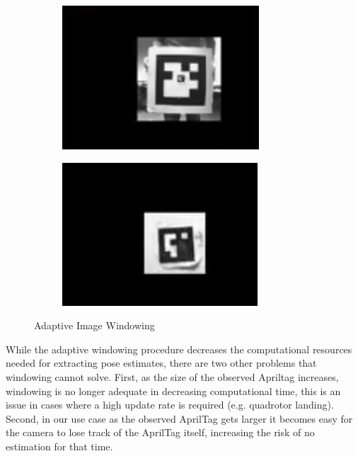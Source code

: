 \documentclass[11pt, twocolumn]{article}
\begin{document}
\begin{figure}[H]
	\centering
	\begin{subfigure}[b]{0.45\linewidth}
		\includegraphics[width=\textwidth]{images/apriltags_roi_1.png}
	\end{subfigure}
	\begin{subfigure}[b]{0.45\linewidth}
		\includegraphics[width=\textwidth]{images/apriltags_roi_2.png}
	\end{subfigure}
	\caption{Adaptive Image Windowing}
	\label{fig:apriltags_windowing}
\end{figure}

While the adaptive windowing procedure decreases the computational resources needed for extracting pose estimates, there are two other problems that windowing cannot solve. First, as the size of the observed Apriltag increases, windowing is no longer adequate in decreasing computational time, this is an issue in cases where a high update rate is required (e.g. quadrotor landing). Second, in our use case as the observed AprilTag gets larger it becomes easy for the camera to lose track of the AprilTag itself, increasing the risk of no estimation for that time.
\end{document}
